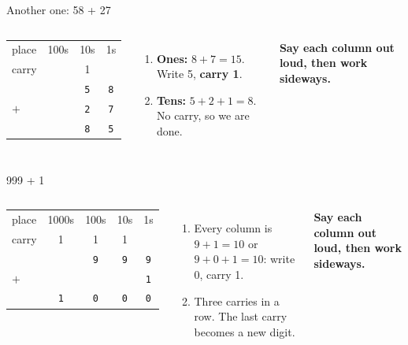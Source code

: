 \documentclass[aspectratio=169,10pt]{beamer}
\newcommand{\gc}[1]{\textcolor{black!60}{\footnotesize #1}}
\begin{document}
\begin{frame}{Another one: 58 + 27}
\begin{columns}[c]
\begin{center}{\huge
\begin{tabular}{@{}l@{\ \ }c@{\ \ }c@{\ \ }c@{}}
\gc{place} & \gc{100s} & \gc{10s} & \gc{1s}\\
\gc{carry} &  & \gc{1} & \\
 &  & \texttt{5} & \texttt{8}\\
$+$ &  & \texttt{2} & \texttt{7}\\\hline
 & \texttt{} & \texttt{8} & \texttt{5}
\end{tabular}}\end{center}
\begin{enumerate}
\item \textbf{Ones:} $8+7=15$. Write 5, \textbf{carry 1}.
\item \textbf{Tens:} $5+2+1=8$. No carry, so we are done.
\end{enumerate}
\textbf{Say each column out loud, then work sideways.}
\end{columns}
\end{frame}

\begin{frame}{999 + 1}
\begin{columns}[c]
\begin{center}{\huge
\begin{tabular}{@{}l@{\ \ }c@{\ \ }c@{\ \ }c@{\ \ }c@{}}
\gc{place} & \gc{1000s} & \gc{100s} & \gc{10s} & \gc{1s}\\
\gc{carry} & \gc{1} & \gc{1} & \gc{1} & \\
 &  & \texttt{9} & \texttt{9} & \texttt{9}\\
$+$ &  &  &  & \texttt{1}\\\hline
 & \texttt{1} & \texttt{0} & \texttt{0} & \texttt{0}
\end{tabular}}\end{center}
\begin{enumerate}
\item Every column is $9+1=10$ or $9+0+1=10$: write 0, carry 1.
\item Three carries in a row. The last carry becomes a new digit.
\end{enumerate}
\textbf{Say each column out loud, then work sideways.}
\end{columns}
\end{frame}
\end{document}
